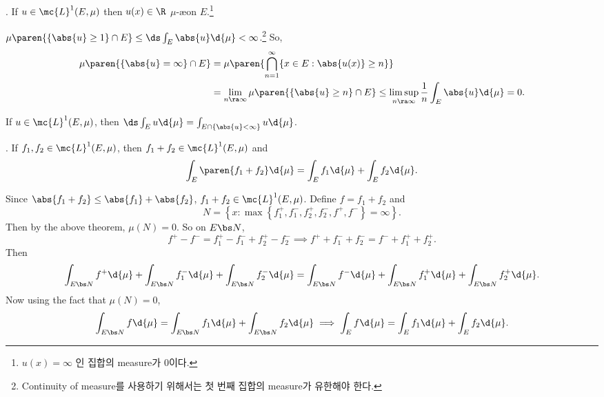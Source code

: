 \pagebreak

\thm. If \(u \in \mc{L}^{1}(E, \mu)\) then \(u(x) \in \R\) \(\mu\)-\ae on \(E\).\footnote{\(u(x) = \infty\) 인 집합의 measure가 0이다.}

\pf \(\mu\paren{\{\abs{u} \geq 1\}\cap E} \leq \ds \int_E \abs{u} \d{\mu} < \infty\).\footnote{Continuity of measure를 사용하기 위해서는 첫 번째 집합의 measure가 유한해야 한다.} So,
\[
    \begin{aligned}
        \mu\paren{\{\abs{u} = \infty\} \cap E} & = \mu\paren{\bigcap_{n=1}^\infty \{x \in E : \abs{u(x)} \geq n\}}                                                            \\
                                               & = \lim_{n \ra \infty} \mu\paren{\{\abs{u} \geq n\} \cap E} \leq \limsup_{n\ra\infty} \frac{1}{n} \int_E \abs{u} \d{\mu} = 0.
    \end{aligned}
\]

\cor If \(u \in \mc{L}^{1}(E, \mu)\), then \(\ds \int_E u \d{\mu} = \int_{E \cap \{\abs{u} < \infty\}} u \d{\mu}\).

\thm. If \(f_1, f_2 \in \mc{L}^{1}(E, \mu)\), then \(f_1 + f_2 \in \mc{L}^{1}(E, \mu)\) and
\[
    \int_E \paren{f_1 + f_2} \d{\mu} = \int_E f_1 \d{\mu} + \int_E f_2 \d{\mu}.
\]

\pf Since \(\abs{f_1 + f_2} \leq \abs{f_1} + \abs{f_2}\), \(f_1+f_2 \in \mc{L}^{1}(E, \mu)\). Define \(f = f_1 + f_2\) and
\[
    N = \left\{x : \max\left\{f_1^+, f_1^-, f_2^+, f_2^-, f^+, f^-\right\} = \infty \right\}.
\]
Then by the above theorem, \(\mu(N) = 0\). So on \(E \bs N\),
\[
    f^+ - f^- = f_1^+ - f_1^- + f_2^+ - f_2^- \implies f^+ + f_1^- + f_2^- = f^- + f_1^+ + f_2^+.
\]
Then
\[
    \int_{E\bs N} f^+ \d{\mu} + \int_{E\bs N} f_1^- \d{\mu} + \int_{E\bs N} f_2^- \d{\mu} = \int_{E\bs N} f^-\d{\mu} + \int_{E\bs N} f_1^+\d{\mu} + \int_{E\bs N} f_2^+ \d{\mu}.
\]
Now using the fact that \(\mu(N) = 0\),
\[
    \int_{E \bs N} f \d{\mu} = \int_{E \bs N} f_1 \d{\mu} + \int_{E \bs N} f_2 \d{\mu} \implies \int_{E} f \d{\mu} = \int_{E} f_1 \d{\mu} + \int_{E} f_2 \d{\mu}.
\]
\pagebreak
